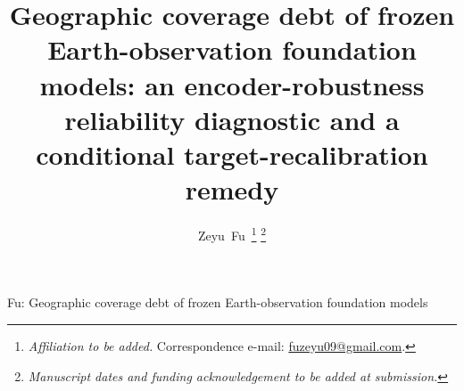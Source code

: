 \documentclass[journal]{IEEEtran}
\renewcommand{\_}{\textunderscore\allowbreak}
\begin{document}
\title{Geographic coverage debt of frozen Earth-observation foundation models:
an encoder-robustness reliability diagnostic and a conditional
target-recalibration remedy}

\author{Zeyu~Fu\,%
\thanks{\textit{Affiliation to be added.} Correspondence e-mail: \href{mailto:fuzeyu09@gmail.com}{fuzeyu09@gmail.com}.}%
\thanks{\textit{Manuscript dates and funding acknowledgement to be added at submission.}}}

%
{Fu: Geographic coverage debt of frozen Earth-observation foundation models}

\maketitle
\end{document}
